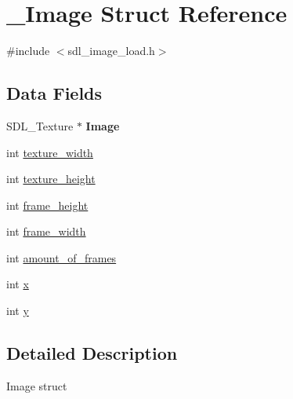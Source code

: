 \hypertarget{struct___image}{\section{\+\_\+\+Image Struct Reference}
\label{struct___image}
}


{\ttfamily \#include $<$sdl\+\_\+image\+\_\+load.\+h$>$}

\subsection*{Data Fields}
\begin{DoxyCompactItemize}
\item 
\hypertarget{struct___image_a97b32deb280734d771eb91b82a2251a3}{S\+D\+L\+\_\+\+Texture $\ast$ {\bfseries Image}}\label{struct___image_a97b32deb280734d771eb91b82a2251a3}

\item 
int \hyperlink{struct___image_ae4f71de45f0a2263d14930dcf8691f5d}{texture\+\_\+width}
\item 
int \hyperlink{struct___image_a22e910452b37a1bcd9b35c927236af20}{texture\+\_\+height}
\item 
int \hyperlink{struct___image_ac2614f43e36df461d5e4729be3ad04b4}{frame\+\_\+height}
\item 
int \hyperlink{struct___image_a4f1bbe063dc390226d56e9eb79afc663}{frame\+\_\+width}
\item 
int \hyperlink{struct___image_a2a2e85b75bd743d491247027f5ff7a21}{amount\+\_\+of\+\_\+frames}
\item 
int \hyperlink{struct___image_a6150e0515f7202e2fb518f7206ed97dc}{x}
\item 
int \hyperlink{struct___image_a0a2f84ed7838f07779ae24c5a9086d33}{y}
\end{DoxyCompactItemize}


\subsection{Detailed Description}
Image struct 

